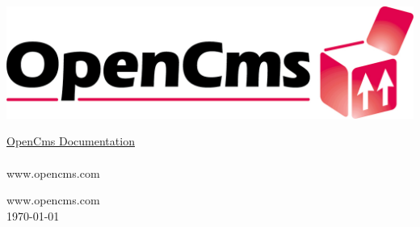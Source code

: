 
\begin{titlepage}
\begin{flushright}
  \includegraphics[width=0.4\linewidth]{pics/logo}
\end{flushright}
\vspace{8cm}
\Huge
\titleFont \underline{OpenCms Documentation}\\
\\
\vfill
\normalsize
www.opencms.com
\end{titlepage}

\newpage
\thispagestyle{empty}
\vspace*{\fill}
www.opencms.com\\
\today

